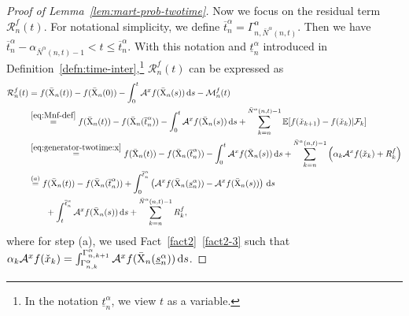 \documentclass[11pt]{article}
\theoremstyle{plain}
\theoremstyle{definition}
\def\d{\mathrm{d}}
\def\MM{{\mathcal M}}
\def\AM{{\mathcal A}}
\def\FM{{\mathcal F}}
\def\RM{{\mathcal R}}
\def\EB{{\mathbb E}}
\newcommand{\xcheck}{{\check{x}}}
\newcommand{\xbar}{{\bar{\textnormal{X}}}}
\newcommand{\ssum}[3]{\sum\limits_{{#1}={#2}}^{#3}}
\begin{document}
\begin{appendix}
\begin{proof}[Proof of Lemma~\ref{lem:mart-prob-twotime}]
    Now we focus on the residual term $\RM_{n}^f(t)$. For notational simplicity, we define $\overline{t}^\alpha_{n} = \Gamma^\alpha_{n, \bar{N}^\alpha(n,t)} 
    $.
    Then we have $\overline{t}^\alpha_{n} - \alpha_{\bar{N}^\alpha(n,t) - 1} < t \le \overline{t}^\alpha_{n}$.
    With this notation and $\underline{t}^\alpha_{n}$ introduced in Definition~\ref{defn:time-inter},\footnote{In the notation $\underline{t}^\alpha_{n}$, we view $t$ as a variable.}
    $\RM_{n}^f(t)$ can be expressed as
    \begin{align}
        \RM_{n}^f(t) 
        & = f( \xbar_{n}(t) ) - f(\xbar_{n}(0) ) - \int_0^t \AM^x f( \xbar_{n}(s) )\, \d s - \MM_{n} ^f(t)  \nonumber \\
        & \overset{\eqref{eq:Mnf-def}}{=} f(\xbar_{n}(t)) - f(\xbar_{n}(\overline{t}^\alpha_{n}) ) - \int_0^t \AM^x f(\xbar_{n}(s)) \,\d s  + \ssum{k}{n}{\bar{N}^\alpha(n,t)-1} \EB [ f(\xcheck_{k+1}) - f(\xcheck_{k}) | \FM_{k} ] \nonumber \\
        & \overset{\eqref{eq:generator-twotime:x}}{=} f(\xbar_{n}(t)) - f(\xbar_{n}(\overline{t}^\alpha_{n}) )
        - \int_0^t \AM^x f(\xbar_{n}(s)) \,\d s
        + \ssum{k}{n}{\bar{N}^\alpha(n,t)-1} \left( \alpha_{k} \AM^x f(\xcheck_{k}) + R^f_k \right) \nonumber \\
        & \overset{(a)}{=}
        f(\xbar_{n}(t)) - f(\xbar_{n}(\overline{t}^\alpha_{n}) )
        + \int_0^{\overline{t}^\alpha_{n}} \left( \AM^x f(\xbar_{n}(\underline{s}^\alpha_{n}) ) - \AM^x f(\xbar_{n}(s)) \right) \,\d s  \nonumber \\
        & \qquad   + \int_t^{\overline{t}^\alpha_{n}} \AM^x f(\xbar_{n}(s)) \,\d s
        + \ssum{k}{n}{\bar{N}^\alpha(n,t) - 1} R^f_k, \label{eq:them:fclt-twotime:res}
    \end{align}
    where for step (a), we used Fact~\ref{fact2}~\ref{fact2-3} such that  $\alpha_{k} \AM^x f(\xcheck_{k}) = \int_{\Gamma^\alpha_{n,k}}^{\Gamma^\alpha_{n,k+1}}  \AM^x f( \xbar_{n}( \underline{s}^\alpha_n ) ) \,\d s  $.
    

\end{proof}
\end{appendix}
\end{document}
